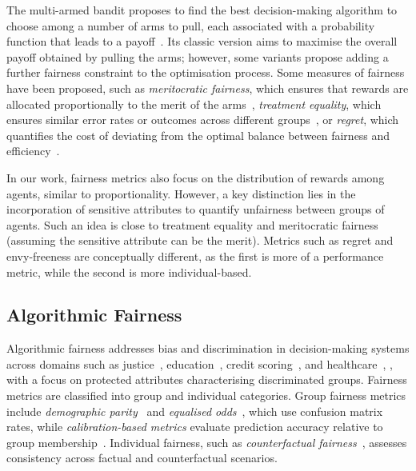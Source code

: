 The multi-armed bandit proposes to find the best decision-making algorithm to choose among a number of arms to pull, each associated with a probability function that leads to a payoff~\cite{Bouneffouf2020}. Its classic version aims to maximise the overall payoff obtained by pulling the arms; however, some variants propose adding a further fairness constraint to the optimisation process. Some measures of fairness have been proposed, such as \textit{meritocratic fairness}, which ensures that rewards are allocated proportionally to the merit of the arms~\cite{Joseph2016}, \textit{treatment equality}, which ensures similar error rates or outcomes across different groups~\cite{Liu2017}, or \textit{regret}, which quantifies the cost of deviating from the optimal balance between fairness and efficiency~\cite{Li2020,Patil2021,Jones2023,Barman2023}.

In our work, fairness metrics also focus on the distribution of rewards among agents, similar to proportionality. 
However, a key distinction lies in the incorporation of sensitive attributes to quantify unfairness between groups of agents. Such an idea is close to treatment equality and meritocratic fairness (assuming the sensitive attribute can be the merit). Metrics such as regret and envy-freeness are conceptually different, as the first is more of a performance metric, while the second is more individual-based.

\subsection{Algorithmic Fairness}
Algorithmic fairness addresses bias and discrimination in decision-making systems across domains such as justice~\cite{Berk2019}, education~\cite{Baker2021}, credit scoring~\cite{Kozodoi2022}, and healthcare~\cite{Vyas2020}, \cite{Giovanola2022}, with a focus on protected attributes characterising discriminated groups.
Fairness metrics are classified into group and individual categories. Group fairness metrics include \textit{demographic parity}~\cite{Kamishima2012} and \textit{equalised odds}~\cite{Hardt2016}, which use confusion matrix rates, while \textit{calibration-based metrics} evaluate prediction accuracy relative to group membership~\cite{Chouldechova2016}. Individual fairness, such as \textit{counterfactual fairness}~\cite{Kusner2018}, assesses consistency across factual and counterfactual scenarios.

